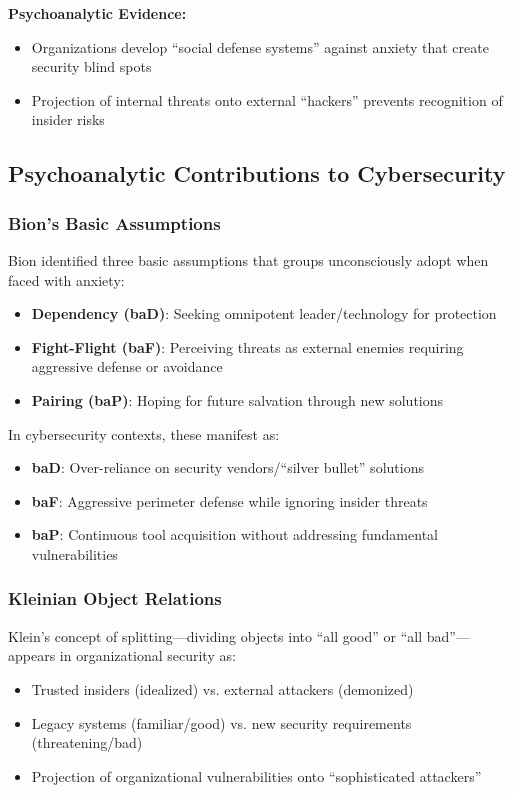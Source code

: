 \documentclass[11pt,a4paper]{article}
\begin{document}
\textbf{Psychoanalytic Evidence:}
\begin{itemize}
\item Organizations develop ``social defense systems'' against anxiety that create security blind spots\cite{menzies1960}
\item Projection of internal threats onto external ``hackers'' prevents recognition of insider risks\cite{klein1946}
\end{itemize}

\subsection{Psychoanalytic Contributions to Cybersecurity}

\subsubsection{Bion's Basic Assumptions}

Bion\cite{bion1961} identified three basic assumptions that groups unconsciously adopt when faced with anxiety:
\begin{itemize}
\item \textbf{Dependency (baD)}: Seeking omnipotent leader/technology for protection
\item \textbf{Fight-Flight (baF)}: Perceiving threats as external enemies requiring aggressive defense or avoidance
\item \textbf{Pairing (baP)}: Hoping for future salvation through new solutions
\end{itemize}

In cybersecurity contexts, these manifest as:
\begin{itemize}
\item \textbf{baD}: Over-reliance on security vendors/``silver bullet'' solutions
\item \textbf{baF}: Aggressive perimeter defense while ignoring insider threats
\item \textbf{baP}: Continuous tool acquisition without addressing fundamental vulnerabilities
\end{itemize}

\subsubsection{Kleinian Object Relations}

Klein's\cite{klein1946} concept of splitting---dividing objects into ``all good'' or ``all bad''---appears in organizational security as:
\begin{itemize}
\item Trusted insiders (idealized) vs. external attackers (demonized)
\item Legacy systems (familiar/good) vs. new security requirements (threatening/bad)
\item Projection of organizational vulnerabilities onto ``sophisticated attackers''
\end{itemize}
\end{document}
